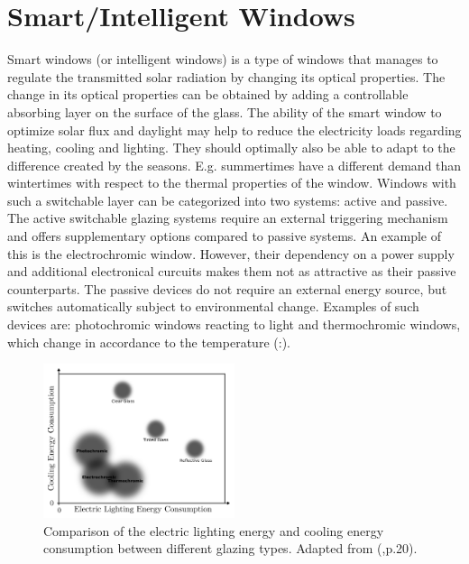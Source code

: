 \section{Smart/Intelligent Windows}
Smart windows (or intelligent windows) is a type of windows that manages to 
regulate the transmitted solar radiation by changing its optical properties.
The change in its optical properties can be
obtained by adding a controllable absorbing layer on the surface of the glass. 
The ability of the smart window to optimize solar flux and daylight may help to
reduce the electricity loads regarding heating, cooling and lighting.
They should optimally also be able to adapt to the difference created by the seasons. E.g. summertimes
have a different demand than wintertimes with respect to the thermal properties of the window.
\cite{Dussault2012,Jelle2010,White1999}
Windows with such a
switchable layer can be categorized into two systems: active and passive. The active switchable glazing 
systems require an external triggering mechanism and offers supplementary options compared to 
passive systems. An example of this is the electrochromic window. 
However, their dependency on a power supply and additional 
electronical curcuits makes them not as attractive as their passive counterparts.  
The passive devices do not require an external energy source, but switches automatically
subject to environmental change. Examples of such devices are: photochromic windows reacting to 
light and thermochromic windows, which change in accordance to the temperature 
(\cite{Kamalisarvestani2013}:\cite{Baetens2010}).
%
\begin{figure}[h!]
  \centering
   \includegraphics[width=0.5\textwidth]{Figures/chromicGlassComparison.pdf}
   \caption{Comparison of the electric lighting energy and cooling energy consumption between different
   glazing types. Adapted from (\cite{Huovila2007},p.20). 
   }
   \label{fig:energyComparison}
\end{figure}
